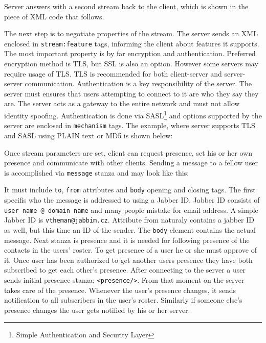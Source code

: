 Server answers with a second stream back to the client, which is shown in the piece of XML code that follows. 

%

The next step is to negotiate properties of the stream. The server sends an XML enclosed in \verb|stream:feature| tags, informing the client about features it supports. The most important property is by far encryption and authentication. Preferred encryption method is TLS, but SSL is also an option. However some servers may require usage of TLS. TLS is recommended for both client-server and server-server communication. Authentication is a key responsibility of the server. The server must ensures that users attempting to connect to it are who they say they are. The server acts as a gateway to the entire network and must not allow identity spoofing. Authentication is done via SASL\footnote{Simple Authentication and Security Layer} and options supported by the server are enclosed in \verb|mechanism| tags. The example, where server supports TLS and SASL using PLAIN text or MD5 is shown below:   

%

Once stream parameters are set, client can request presence, set his or her own presence and communicate with other clients. Sending a message to a fellow user is accomplished via \verb|message| stanza and may look like this:

%

It must include \verb|to|, \verb|from| attributes and \verb|body| opening and closing tags. The first specifis who the message is addressed to using a Jabber ID. Jabber ID consists of \verb|user name @ domain name| and many people mistake for email address. A simple Jabber ID is \verb|vtheman@jabbim.cz|. Attribute from naturaly contains a jabber ID as well, but this time an ID of the sender. The \verb|body| element contains the actual message. 
Next stanza is presence and it is needed for following presence of the contacts in the users' roster. To get presence of a user he or she must approve of it. Once user has been authorized to get another users presence they have both subscribed to get each other's presence. After connecting to the server a user sends initial presence stanza: \verb|<presence/>|. From that moment on the server takes care of the presence. Whenever the user's presence changes, it sends notification to all subscribers in the user's roster. Similarly if someone else's presence changes the user gets notified by his or her server. 

